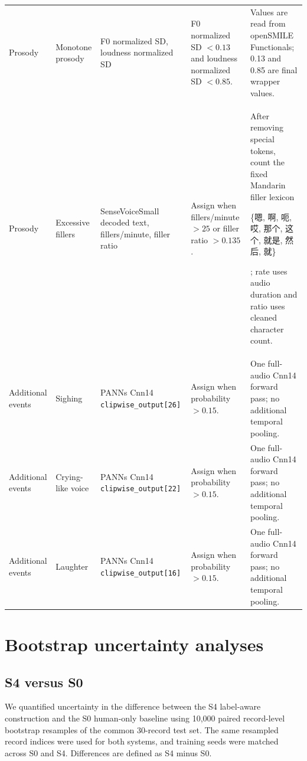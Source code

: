 \documentclass[10pt]{article}
\begin{document}
\begin{landscape}
\begin{longtable}{L{0.75in}L{1.05in}L{1.80in}L{2.45in}L{2.45in}}
Prosody & Monotone prosody & F0 normalized SD, loudness normalized SD & F0 normalized SD $<0.13$ and loudness normalized SD $<0.85$. & Values are read from openSMILE Functionals; 0.13 and 0.85 are final wrapper values. \\
Prosody & Excessive fillers & SenseVoiceSmall decoded text, fillers/minute, filler ratio & Assign when fillers/minute $>25$ or filler ratio $>0.135$. & After removing special tokens, count the fixed Mandarin filler lexicon \begin{CJK}{UTF8}{gbsn}\{嗯, 啊, 呃, 哎, 那个, 这个, 就是, 然后, 就\}\end{CJK}; rate uses audio duration and ratio uses cleaned character count. \\
\midrule
Additional events & Sighing & PANNs Cnn14 \texttt{clipwise\_output[26]} & Assign when probability $>0.15$. & One full-audio Cnn14 forward pass; no additional temporal pooling. \\
Additional events & Crying-like voice & PANNs Cnn14 \texttt{clipwise\_output[22]} & Assign when probability $>0.15$. & One full-audio Cnn14 forward pass; no additional temporal pooling. \\
Additional events & Laughter & PANNs Cnn14 \texttt{clipwise\_output[16]} & Assign when probability $>0.15$. & One full-audio Cnn14 forward pass; no additional temporal pooling. \\
\bottomrule
\end{longtable}
\end{landscape}




\section{Bootstrap uncertainty analyses}

\subsection{S4 versus S0}
We quantified uncertainty in the difference between the S4 label-aware construction and the S0 human-only baseline using 10,000 paired record-level bootstrap resamples of the common 30-record test set. The same resampled record indices were used for both systems, and training seeds were matched across S0 and S4. Differences are defined as S4 minus S0.
\end{document}

